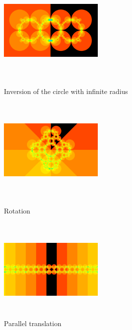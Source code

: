 \begin{figure}[h!tbp]
 \begin{minipage}[t]{0.3\hsize}
  \center
   \includegraphics[width=2in, height=2in, keepaspectratio]{../img/klein/2diis/infCircle.pdf}
  \caption{Inversion of the circle with infinite radius}
  \label{fig:infCircle}
 \end{minipage}
 \hspace*{\fill}
 \begin{minipage}[t]{0.3\hsize}
  \center
  \includegraphics[width=2in, height=2in, keepaspectratio]{../img/klein/2diis/rotation.pdf}
  \caption{Rotation}
  \label{fig:rotation}
 \end{minipage}
 \hspace*{\fill}
 \begin{minipage}[t]{0.3\hsize}
  \center
  \includegraphics[width=2in, height=2in, keepaspectratio]{../img/klein/2diis/translation.pdf}
  \caption{Parallel translation}
  \label{fig:translation2d}
 \end{minipage}
\end{figure}


